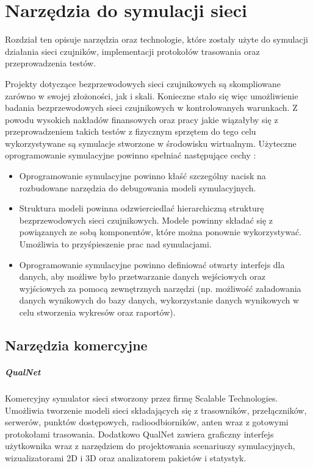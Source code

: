 \chapter{Narzędzia do symulacji sieci}
Rozdział ten opisuje narzędzia oraz technologie, które zostały użyte do symulacji działania sieci czujników, implementacji protokołów trasowania oraz przeprowadzenia testów.

Projekty dotyczące  bezprzewodowych sieci czujnikowych są skompliowane zarówno w swojej złożoności, jak i skali. Konieczne stało się więc umożliwienie badania bezprzewodowych sieci czujnikowych w kontrolowanych warunkach. Z powodu wysokich nakładów finansowych oraz pracy jakie wiązałyby się z przeprowadzeniem takich testów z fizycznym sprzętem do tego celu wykorzystywane są symulacje stworzone w środowisku wirtualnym. Użyteczne oprogramowanie symulacyjne powinno spełniać  następujące cechy \cite{Xian2008}:
\begin{itemize}
	\item Oprogramowanie symulacyjne powinno kłaść szczególny nacisk na rozbudowane narzędzia do debugowania modeli symulacyjnych.
	
	\item Struktura modeli powinna odzwierciedlać hierarchiczną strukturę bezprzewodowych sieci czujnikowych. Modele powinny składać się z powiązanych ze sobą komponentów, które można ponownie wykorzystywać. Umożliwia to przyśpieszenie prac nad symulacjami.
	
	\item Oprogramowanie symulacyjne powinno definiować otwarty interfejs dla danych, aby możliwe było przetwarzanie danych wejściowych oraz wyjściowych za pomocą zewnętrznych narzędzi (np. możliwość załadowania danych wynikowych do bazy danych, wykorzystanie danych wynikowych w celu stworzenia wykresów oraz raportów).
\end{itemize}
\section{Narzędzia komercyjne}
\paragraph{QualNet \cite{Kellner10simulationenvironments}}
Komercyjny symulator sieci stworzony przez firmę Scalable Technologies. Umożliwia tworzenie modeli sieci składających się z trasowników, przełączników, serwerów, punktów dostępowych, radioodbiorników, anten wraz z gotowymi protokołami trasowania. Dodatkowo QualNet zawiera graficzny interfejs użytkownika wraz z narzędziem do projektowania scenariuszy symulacyjnych, wizualizatorami 2D i 3D oraz analizatorem pakietów i statystyk.

